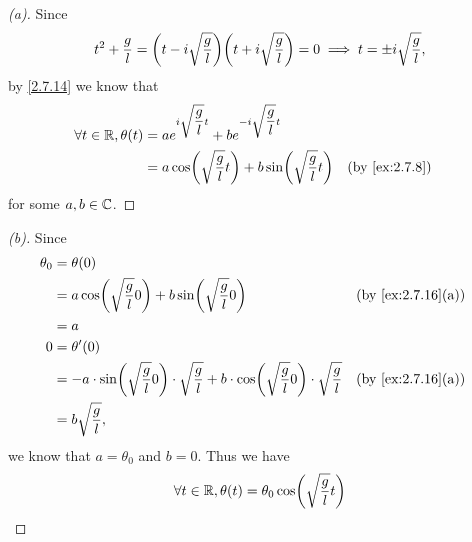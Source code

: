 \begin{proof}[(a)]
  Since
  \[
    t^2 + \dfrac{g}{l} = \pa{t - i \sqrt{\dfrac{g}{l}}} \pa{t + i \sqrt{\dfrac{g}{l}}} = 0 \implies t = \pm i \sqrt{\dfrac{g}{l}},
  \]
  by \cref{2.7.14} we know that
  \begin{align*}
    \forall t \in \R, \theta(t) & = a e^{i \sqrt{\dfrac{g}{l}} t} + b e^{- i \sqrt{\dfrac{g}{l}} t}                        \\
                                & = a \cos\pa{\sqrt{\dfrac{g}{l}} t} + b \sin\pa{\sqrt{\dfrac{g}{l}} t} &  & \by{ex:2.7.8}
  \end{align*}
  for some \(a, b \in \mathbb{C}\).
\end{proof}

\begin{proof}[(b)]
  Since
  \begin{align*}
    \theta_0 & = \theta(0)                                                                                                                                                   \\
             & = a \cos\pa{\sqrt{\dfrac{g}{l}} 0} + b \sin\pa{\sqrt{\dfrac{g}{l}} 0}                                                                  &  & \by{ex:2.7.16}[a] \\
             & = a                                                                                                                                                           \\
    0        & = \theta'(0)                                                                                                                                                  \\
             & = -a \cdot \sin\pa{\sqrt{\dfrac{g}{l}} 0} \cdot \sqrt{\dfrac{g}{l}} + b \cdot \cos\pa{\sqrt{\dfrac{g}{l}} 0} \cdot \sqrt{\dfrac{g}{l}} &  & \by{ex:2.7.16}[a] \\
             & = b \sqrt{\dfrac{g}{l}},
  \end{align*}
  we know that \(a = \theta_0\) and \(b = 0\).
  Thus we have
  \[
    \forall t \in \R, \theta(t) = \theta_0 \cos\pa{\sqrt{\dfrac{g}{l}} t}
  \]
\end{proof}

